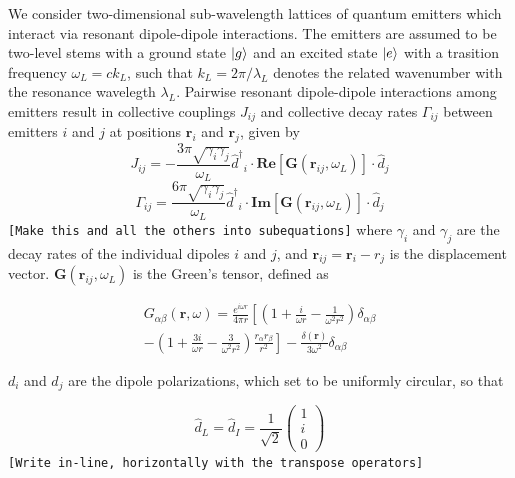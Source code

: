 \documentclass[aps,pra,superscriptaddress,twocolumn]{revtex4-1}
\newcommand{\rr}{\mathbf{r}}
\newcommand{\commentTP}[1]{\texttt{\color{green}[#1]}}
\begin{document}
We consider two-dimensional sub-wavelength lattices of quantum emitters which interact via resonant dipole-dipole interactions. The emitters are assumed to be two-level stems with a ground state $\ket{g}$ and an excited state $\ket{e}$ with a trasition frequency $\omega_L = c k_L$, such that $k_L = 2\pi/\lambda_L$ denotes the related wavenumber with the resonance wavelegth $\lambda_L$. Pairwise resonant dipole-dipole interactions among emitters result in collective couplings $J_{ij}$ and collective decay rates $\Gamma_{ij}$ between emitters $i$ and $j$ at positions $\rr_i$ and $\rr_j$, given by 
\begin{equation} J_{ij} = -\frac{3\pi \sqrt{\gamma_i \gamma_j}}{\omega_L} {\hat{d}^\dagger}_i \cdot \textbf{Re} [\textbf{G}(\textbf{r}_{ij}, \omega_L)] \cdot \hat{d}_j 
\label{eqn:J} \end{equation}
\begin{equation} \Gamma_{ij} = \frac{6\pi \sqrt{\gamma_i \gamma_j}}{\omega_L} {\hat{d}^\dagger}_i \cdot \textbf{Im} [\textbf{G}(\textbf{r}_{ij},\omega_L)] \cdot \hat{d}_j 
\label{eqn:Gamma} \end{equation}
\commentTP{Make this and all the others into subequations}
where $\gamma_i$ and $\gamma_j$ are the decay rates of the individual dipoles $i$ and $j$, and $\rr_{ij} = \rr_i - r_j$ is the displacement vector. $\textbf{G}(\textbf{r}_{ij}, \omega_L)$ is the Green's tensor, defined as 

\begin{multline} 
    G_{\alpha\beta} (\textbf{r}, \omega) = \frac{e^{i\omega r}}{4\pi r} \left[ \left( 1 + \frac{i}{\omega r} - \frac{1}{\omega^2 r^2} \right) \delta_{\alpha\beta}
    \right. \\ \left. 
    - \left( 1 + \frac{3i}{\omega r} - \frac{3}{\omega^2 r^2} \right) \frac{r_\alpha r_\beta}{r^2} \right] - \frac{\delta(\textbf{r})}{3\omega^2} \delta_{\alpha\beta} 
    \label{eqn:Green}
\end{multline}

$d_i$ and $d_j$ are the dipole polarizations, which set to be uniformly circular, so that 

\begin{equation} 
    \hat{d}_L = \hat{d}_I = \frac{1}{\sqrt{2}} \begin{pmatrix}
    1 \\ i \\ 0
    \end{pmatrix} 
    \label{eqn:polarization}
\end{equation}
\commentTP{Write in-line, horizontally with the transpose operators}
\end{document}
